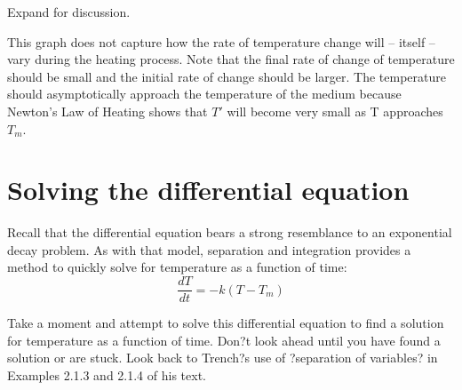 \documentclass{ximera}
\begin{document}
\begin{problem}
\begin{center}  
\end{center}

Expand for discussion.

 \begin{expandable}
    This graph does not capture how the rate of temperature change will – itself – vary during the heating process.  Note that the final rate of change of temperature should be small and the initial rate of change should be larger.  The temperature should asymptotically approach the temperature of the medium because Newton's Law of Heating shows that $T'$ will become very small as T approaches $T_m$.
  \end{expandable}
 
\end{problem}

\section*{Solving the differential equation}

Recall that the differential equation bears a strong resemblance to an exponential decay problem.  As with that model, separation and integration provides a method to quickly solve for temperature as a function of time:
\[
\frac{dT}{dt}=-k(T-T_m)
\]

Take a moment and attempt to solve this differential equation to find a solution for temperature as a function of time.  Don?t look ahead until you have found a solution or are stuck.  Look back to Trench?s use of ?separation of variables? in Examples 2.1.3 and 2.1.4 of his text.
   
\end{document}

